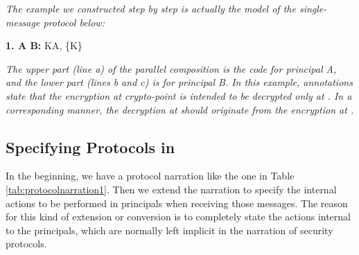 \textit{The example we constructed step by step is actually the \LYSA model of the single-message protocol below:}
\begin{center} \textbf{1. A  B:} KA, \{K\} \end{center}
\textit{The upper part (line a) of the parallel composition is the code for principal A, and the lower part (lines b and c) is for principal B. In this example, annotations state that the encryption at crypto-point  is intended to be decrypted only at . In a corresponding manner, the decryption at  should originate from the encryption at .}

\subsection{Specifying Protocols in \LYSA}
In the beginning, we have a protocol narration like the one in Table \ref{tab:protocolnarration1}. 
Then we extend the narration to specify the internal actions to be performed in principals when receiving those messages. 
The reason for this kind of extension or conversion is to completely state the actions internal to the principals, which are normally left implicit in the narration of security protocols.

